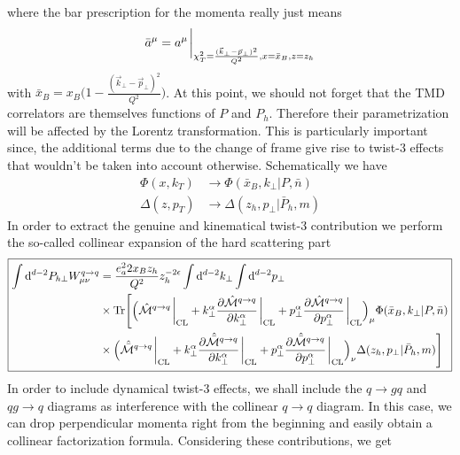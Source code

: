 where the bar prescription for the momenta really just means
\begin{equation}
    \bar a^\mu=a^\mu\eval_{\chi_T^2=\frac{(\vec k_\perp - \vec p_\perp)^2}{Q^2},x=\bar x_B, z=z_h}
\end{equation}
with $\bar x_B = x_B\Big(1-\frac{(\vec k_\perp - \vec p_\perp)^2}{Q^2}\Big)$. At this point, we should not forget that the TMD correlators are themselves functions of $P$ and $P_h$. Therefore their parametrization will be affected by the Lorentz transformation. This is particularly important since, the additional terms due to the change of frame give rise to twist-3 effects that wouldn't be taken into account otherwise. Schematically we have
\begin{equation}
    \begin{aligned}
        \Phi(x,k_T)&\longrightarrow\Phi(\bar x_B, k_\perp|P,\bar n)\\
        \Delta(z, p_T)&\longrightarrow\Delta(z_h, p_\perp|\bar P_h,m)
    \end{aligned}
\end{equation}
     In order to extract the genuine and kinematical twist-3 contribution we perform the so-called collinear expansion of the hard scattering part
\begin{equation}\label{eq:hadronic tensor LO gen+kin}\boxed{
    \begin{aligned}
        \int\dd^{d-2}P_{h\perp} W_{\mu\nu}^{q \to q} &= \frac{e_a^22x_B z_h}{Q^2} z_h^{-2\epsilon}\int \dd^{d-2}k_\perp \int \dd^{d-2}p_\perp \\&\times \text{Tr}\Bigg[\Big(\hat{\mathcal{M}}^{q\to q}\eval_{\text{CL}}+k_\perp^\alpha\pdv{\hat{\mathcal{M}}^{q\to q}}{k_\perp^\alpha}\eval_{\text{CL}}+p_\perp^\alpha\pdv{\hat{\mathcal{M}}^{q\to q}}{p_\perp^\alpha}\eval_{\text{CL}}\Big)_\mu\Phi(\bar x_B, k_\perp|P,\bar n)\\
        &\times\Big(\hat{\bar{\mathcal{M}}}^{q\to q}\eval_{\text{CL}}+k_\perp^\alpha\pdv{\hat{\bar{\mathcal{M}}}^{q\to q}}{k_\perp^\alpha}\eval_{\text{CL}}+p_\perp^\alpha\pdv{\hat{\bar{\mathcal{M}}}^{q\to q}}{p_\perp^\alpha}\eval_{\text{CL}}\Big)_\nu\Delta(z_h, p_\perp|\bar P_h,m)\Bigg] 
    \end{aligned} }
\end{equation}
In order to include dynamical twist-3 effects, we shall include the $q\to g q$ and $q g \to q$ diagrams as interference with the collinear $q \to q $ diagram. In this case, we can drop perpendicular momenta right from the beginning and easily obtain a collinear factorization formula. Considering these contributions, we get
